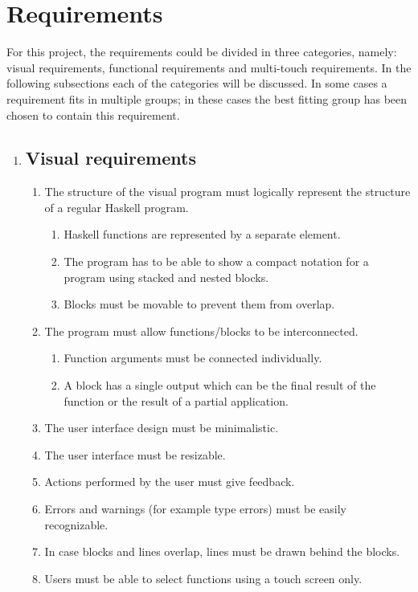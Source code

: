 \section{Requirements}

For this project, the requirements could be divided in three categories, namely: visual requirements, functional requirements and multi-touch requirements. In the following subsections each of the categories will be discussed. In some cases a requirement fits in multiple groups; in these cases the best fitting group has been chosen to contain this requirement.

\begin{enumerate}
\item \subsection*{Visual requirements} 

\begin{enumerate}
	\item The structure of the visual program must logically represent the structure of a regular Haskell program.
		\begin{enumerate}
			\item Haskell functions are represented by a separate element.
			\item The program has to be able to show a compact notation for a program using stacked and nested blocks.
			\item Blocks must be movable to prevent them from overlap.
		\end{enumerate}
	\item The program must allow functions/blocks to be interconnected.
		\begin{enumerate}
			\item Function arguments must be connected individually.
			\item A block has a single output which can be the final result of the function or the result of a partial application.
		\end{enumerate}
	\item The user interface design must be minimalistic.
	\item The user interface must be resizable.
	\item Actions performed by the user must give feedback.
	\item Errors and warnings (for example type errors) must be easily recognizable.
	\item In case blocks and lines overlap, lines must be drawn behind the blocks.
	\item Users must be able to select functions using a touch screen only.
\end{enumerate}


\end{enumerate}
